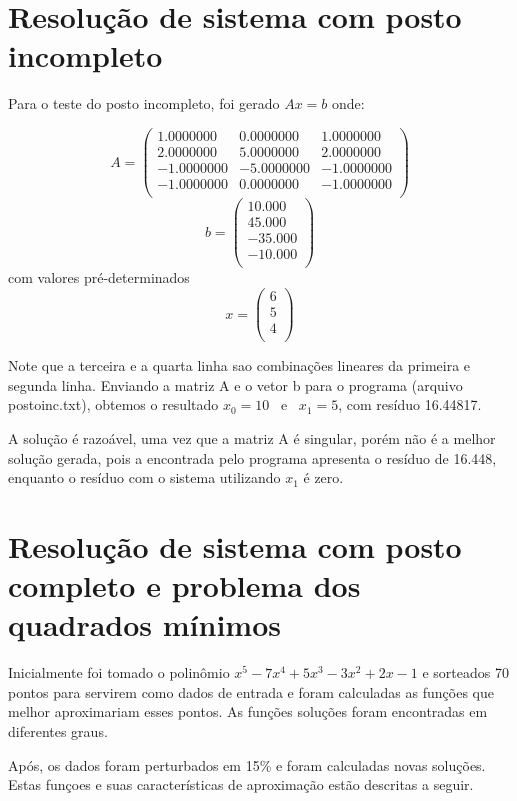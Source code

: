 

\chapter{Resolução de sistema com posto incompleto}
Para o teste do posto incompleto, foi gerado $Ax = b$ onde:


\[
A =
\left(
\begin{array}{ccc}
	1.0000000 & 0.0000000 & 1.0000000\\
	2.0000000 & 5.0000000 & 2.0000000\\
	-1.0000000 & -5.0000000 & -1.0000000\\
	-1.0000000 & 0.0000000 & -1.0000000\\
\end{array}
\right)
\]
\[
b =
\left(
\begin{array}{c}
10.000  \\
45.000  \\
-35.000  \\
-10.000  \\
\end{array}\right)    
\]
com valores pré-determinados\[ x = 
\left(
\begin{array}{c}
6\\
5\\
4\\
\end{array}
\right)\]

Note que a terceira e a quarta linha sao combinações lineares da primeira e segunda linha.
Enviando a matriz A e o vetor b para o programa (arquivo postoinc.txt), obtemos o resultado $x_0 = 10$ ~e~ $x_1 = 5$, com resíduo 16.44817.

A solução é razoável, uma vez que a matriz A é singular, porém não é a melhor solução gerada, pois a encontrada pelo programa apresenta o resíduo de 16.448, enquanto o resíduo com o sistema utilizando $x_1$ é zero.




\chapter{Resolução de sistema com posto completo e problema dos quadrados mínimos}
Inicialmente foi tomado o polinômio $x^5-7x^4+5x^3-3x^2+2x-1$ e sorteados
70 pontos para servirem como  dados de entrada e foram calculadas as funções que
melhor aproximariam esses pontos.
As funções soluções foram encontradas em diferentes graus. 

Após, os dados foram perturbados em 15\% e foram calculadas novas
soluções. Estas funçoes e suas características de aproximação estão descritas 
a seguir.

